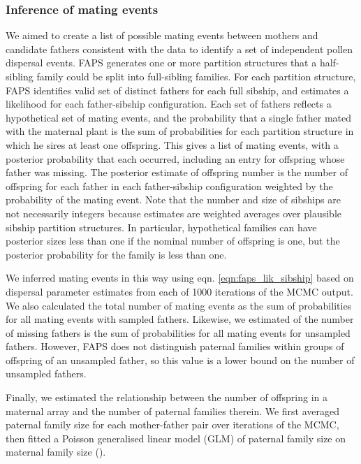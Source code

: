 \documentclass[10pt, a4paper, twocolumn]{article} %
\begin{document}
\subsubsection{Inference of mating events}

We aimed to create a list of possible mating events between mothers and candidate fathers consistent with the data to identify a set of independent pollen dispersal events.
FAPS generates one or more partition structures that a half-sibling family could be split into full-sibling families.
For each partition structure, FAPS identifies valid set of distinct fathers for each full sibship, and estimates a likelihood for each father-sibship configuration.
Each set of fathers reflects a hypothetical set of mating events, and the probability that a single father mated with the maternal plant is the sum of probabilities for each partition structure in which he sires at least one offspring.
This gives a list of mating events, with a posterior probability that each occurred, including an entry for offspring whose father was missing.
The posterior estimate of offspring number is the number of offspring for each father in each father-sibship configuration weighted by the probability of the mating event.
Note that the number and size of sibships are not necessarily integers because estimates are weighted averages over plausible sibship partition structures.
In particular, hypothetical families can have posterior sizes less than one if the nominal number of offspring is one, but the posterior probability for the family is less than one.

We inferred mating events in this way using eqn. \ref{eqn:faps_lik_sibship} based on dispersal parameter estimates from each of 1000 iterations of the MCMC output.
We also calculated the total number of mating events as the sum of probabilities for all mating events with sampled fathers.
Likewise, we estimated of the number of missing fathers is the sum of probabilities for all mating events for unsampled fathers.
However, FAPS does not distinguish paternal families within groups of offspring of an unsampled father, so this value is a lower bound on the number of unsampled fathers.

Finally, we estimated the relationship between the number of offspring in a maternal array and the number of paternal families therein.
We first averaged paternal family size for each mother-father pair over iterations of the MCMC, then fitted a Poisson generalised linear model (GLM) of paternal family size on maternal family size (\cite{McCullagh1989}).
\end{document}
